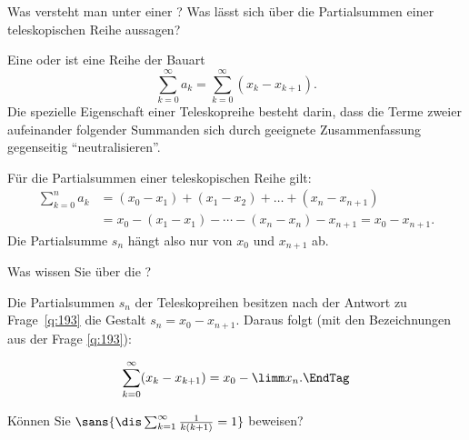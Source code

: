 \begin{frage}\label{02_tele}
  Was versteht man unter einer ?
  Was lässt sich über die Partialsummen einer teleskopischen Reihe 
  aussagen?
\end{frage}

\begin{antwort}
  \label{q:193}
  Eine  oder  
  ist eine Reihe der Bauart
  \[
  \sum_{k=0}^\infty a_k = \sum_{k=0}^\infty (x_{k}-x_{k+1}). 
  \]
  Die spezielle Eigenschaft einer Teleskopreihe 
  besteht darin, dass die Terme zweier 
  aufeinander folgender Summanden sich durch geeignete Zusammenfassung 
  gegenseitig "`neutralisieren"'. 
  
  Für die Partialsummen einer teleskopischen Reihe gilt:
  \begin{align*}
    \sum_{k=0}^n a_k &= (x_0 - x_1)+(x_1-x_2)+\ldots + (x_n-x_{n+1}) \\
    &=
    x_0 - (x_1-x_1) -\cdots - (x_n - x_n ) -x_{n+1}= x_0-x_{n+1}.  
  \end{align*} 
  Die Partialsumme $s_n$ hängt also nur von $x_0$ und $x_{n+1}$ ab.
\end{antwort}

\begin{frage}
  \label{02_tkonv}
  Was wissen Sie über die ?
\end{frage}

\begin{antwort}
  Die Partialsummen $s_n$ der Teleskopreihen besitzen nach 
  der Antwort zu Frage~\ref{q:193} die Gestalt $s_n = x_0 - x_{n+1}$. 
  Daraus folgt (mit den Bezeichnungen aus der Frage \ref{q:193}): 

  \medskip\noindent
  \begin{equation}
    \sum_{k=0}^\infty (x_{k}-x_{k+1}) 
    = x_0 - \limm x_n. \EndTag
  \end{equation}
\end{antwort}

\begin{frage}\label{02_telea}
  Können Sie 
  $\sans{\dis \sum_{k=1}^\infty \frac{1}{k(k+1)} =1}$ beweisen?
\end{frage}

